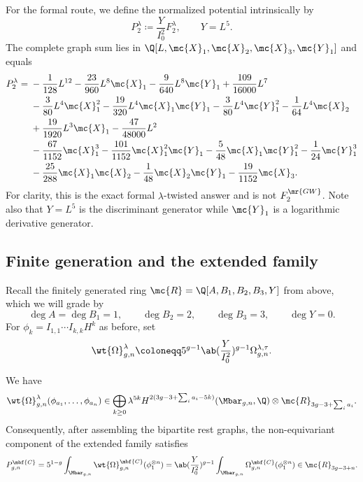 For the formal route, we define the normalized potential intrinsically by
\[ P_2^{\lambda} \coloneqq \frac{Y}{I_0^2}F_2^{\lambda}, \qquad Y = L^5. \]
The complete graph sum lies in \(\Q[L,\mc{X}_1,\mc{X}_2,\mc{X}_3,\mc{Y}_1]\) and equals
\begin{align*}
    P_2^{\lambda} ={}& -\frac{1}{128}L^{12} - \frac{23}{960}L^8\mc{X}_1 - \frac{9}{640}L^8\mc{Y}_1 + \frac{109}{16000}L^7 \\
    &- \frac{3}{80}L^4\mc{X}_1^2 - \frac{19}{320}L^4\mc{X}_1\mc{Y}_1 - \frac{3}{80}L^4\mc{Y}_1^2 - \frac{1}{64}L^4\mc{X}_2 \\
    &+ \frac{19}{1920}L^3\mc{X}_1 - \frac{47}{48000}L^2 \\
    &- \frac{67}{1152}\mc{X}_1^3 - \frac{101}{1152}\mc{X}_1^2\mc{Y}_1 - \frac{5}{48}\mc{X}_1\mc{Y}_1^2 - \frac{1}{24}\mc{Y}_1^3 \\
    &- \frac{25}{288}\mc{X}_1\mc{X}_2 - \frac{1}{48}\mc{X}_2\mc{Y}_1 - \frac{19}{1152}\mc{X}_3.
\end{align*}
For clarity, this is the exact formal \(\lambda\)-twisted answer and is not \(F_2^{\mr{GW}}\). Note also that \(Y = L^5\) is the discriminant generator while \(\mc{Y}_1\) is a logarithmic derivative generator.

\subsection{Finite generation and the extended family}%
\label{sub:Finite generation and the extended family}

Recall the finitely generated ring \(\mc{R} = \Q[A,B_1,B_2,B_3,Y]\) from above, which we will grade by
\[ \deg A = \deg B_1 = 1, \qquad \deg B_2 = 2, \qquad \deg B_3 = 3, \qquad \deg Y = 0. \]
For \(\phi_k = I_{1,1}\cdots I_{k,k}H^k\) as before, set
\[ \wt{\Omega}^{\lambda}_{g,n} \coloneqq 5^{g-1}\ab(\frac{Y}{I_0^2})^{g-1}\Omega^{\lambda,\tau}_{g,n}. \]

\begin{thm}%
\label{thm:graded finite generation}
    We have
    \[ \wt{\Omega}^{\lambda}_{g,n}(\phi_{a_1}, \ldots, \phi_{a_n}) \in \bigoplus_{k \geq 0}\lambda^{5k}H^{2(3g-3+\sum_i a_i - 5k)}(\Mbar_{g,n},\Q)\otimes \mc{R}_{3g-3+\sum_i a_i}. \]
    Consequently, after assembling the bipartite rest graphs, the non-equivariant component of the extended family satisfies
    \[ P^{\mbf{C}}_{g,n} = 5^{1-g}\int_{\Mbar_{g,n}}\wt{\Omega}^{\mbf{C}}_{g,n}(\phi_1^{\otimes n}) = \ab( \frac{Y}{I_0^2})^{g-1}\int_{\Mbar_{g,n}}\Omega^{\mbf{C}}_{g,n}(\phi_1^{\otimes n}) \in \mc{R}_{3g-3+n}. \]
\end{thm}


